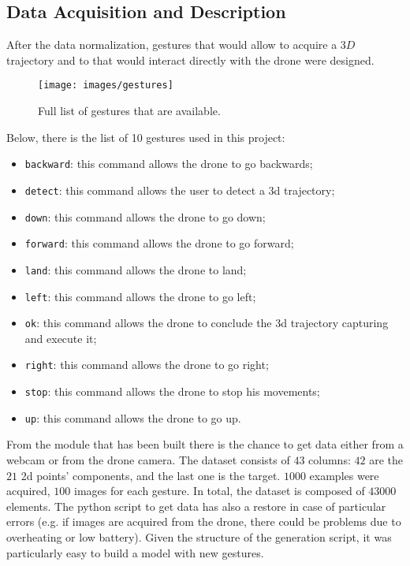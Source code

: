 \subsection{Data Acquisition and Description}
\label{sec:getdata}
After the data normalization, gestures that would allow to acquire a $3D$ trajectory and to that would interact directly with the drone were designed. \\

\begin{figure}[H]
	\centering
	\texttt{[image: images/gestures]}
	\caption[Full list of gestures.]{Full list of gestures that are available.}
	\label{fig:gestures}
\end{figure}

\noindent Below, there is the list of 10 gestures used in this project:
\begin{itemize}
	\item \texttt{backward}: this command allows the drone to go backwards;
	\item \texttt{detect}: this command allows the user to detect a \gls{3d} trajectory;
	\item \texttt{down}: this command allows the drone to go down;
	\item \texttt{forward}: this command allows the drone to go forward;
	\item \texttt{land}: this command allows the drone to land;
	\item \texttt{left}: this command allows the drone to go left;
	\item \texttt{ok}: this command allows the drone to conclude the \gls{3d} trajectory capturing and execute it;
	\item \texttt{right}: this command allows the drone to go right;
	\item \texttt{stop}: this command allows the drone to stop his movements;
	\item \texttt{up}: this command allows the drone to go up.
\end{itemize}

\noindent From the module that has been built there is the chance to get data either from a webcam or from the drone camera. The dataset consists of $43$ columns: $42$ are the $21$ \gls{2d} points’ components, and the last one is the target. $1000$ examples were acquired, $100$ images for each gesture. In total, the dataset is composed of $43000$ elements. The python script to get data has also a restore in case of particular errors (e.g. if images are acquired from the drone, there could be problems due to overheating or low battery). Given the structure of the generation script, it was particularly easy to build a model with new gestures.

